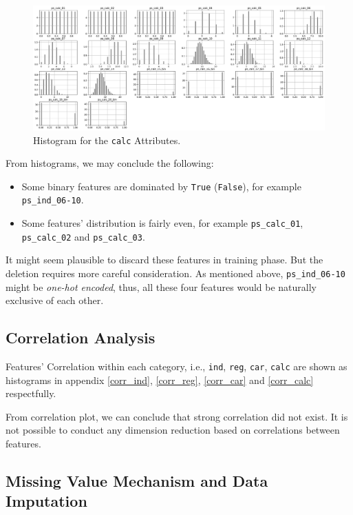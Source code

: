 \documentclass{standalone}
\begin{document}
\begin{figure}[!ht]
\centering
\includegraphics[width=\textwidth]{fig/calc_col.pdf}
\caption{Histogram for the \lstinline{calc} Attributes.}
\label{hist_calc}
\end{figure}

From histograms, we may conclude the following:
\begin{itemize}
\item Some binary features are dominated by \lstinline{True} (\lstinline{False}), for example \lstinline{ps_ind_06-10}.
\item Some features' distribution is fairly even, for example \lstinline{ps_calc_01}, \lstinline{ps_calc_02} and \lstinline{ps_calc_03}.
\end{itemize}

It might seem plausible to discard these features in training phase. But the deletion requires more careful consideration. As mentioned above, \lstinline{ps_ind_06-10} might be \emph{one-hot encoded}, thus, all these four features would be naturally exclusive of each other.

\subsection{Correlation Analysis}

Features' Correlation within each category, i.e., \lstinline{ind}, \lstinline{reg}, \lstinline{car}, \lstinline{calc} are shown as histograms in appendix \cref{corr_ind}, \cref{corr_reg}, \cref{corr_car} and \cref{corr_calc} respectfully.



From correlation plot, we can conclude that strong correlation did not exist.
It is not possible to conduct any dimension reduction based on correlations
between features.

\subsection{Missing Value Mechanism and Data Imputation}
\end{document}
